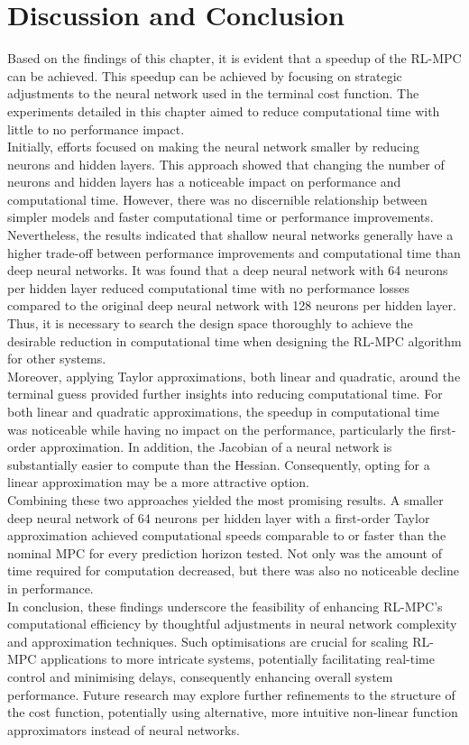 \section{Discussion and Conclusion}
Based on the findings of this chapter, it is evident that a speedup of the RL-MPC can be achieved. This speedup can be achieved by focusing on strategic adjustments to the neural network used in the terminal cost function. The experiments detailed in this chapter aimed to reduce computational time with little to no performance impact.\\
Initially, efforts focused on making the neural network smaller by reducing neurons and hidden layers. This approach showed that changing the number of neurons and hidden layers has a noticeable impact on performance and computational time. However, there was no discernible relationship between simpler models and faster computational time or performance improvements. Nevertheless, the results indicated that shallow neural networks generally have a higher trade-off between performance improvements and computational time than deep neural networks. It was found that a deep neural network with 64 neurons per hidden layer reduced computational time with no performance losses compared to the original deep neural network with 128 neurons per hidden layer. Thus, it is necessary to search the design space thoroughly to achieve the desirable reduction in computational time when designing the RL-MPC algorithm for other systems. \\
Moreover, applying Taylor approximations, both linear and quadratic, around the terminal guess provided further insights into reducing computational time. For both linear and quadratic approximations, the speedup in computational time was noticeable while having no impact on the performance, particularly the first-order approximation. In addition, the Jacobian of a neural network is substantially easier to compute than the Hessian. Consequently, opting for a linear approximation may be a more attractive option.\\
Combining these two approaches yielded the most promising results. A smaller deep neural network of 64 neurons per hidden layer with a first-order Taylor approximation achieved computational speeds comparable to or faster than the nominal MPC for every prediction horizon tested. Not only was the amount of time required for computation decreased, but there was also no noticeable decline in performance. \\
In conclusion, these findings underscore the feasibility of enhancing RL-MPC’s computational efficiency by thoughtful adjustments in neural network complexity and approximation techniques. Such optimisations are crucial for scaling RL-MPC applications to more intricate systems, potentially facilitating real-time control and minimising delays, consequently enhancing overall system performance. Future research may explore further refinements to the structure of the cost function, potentially using alternative, more intuitive non-linear function approximators instead of neural networks.

